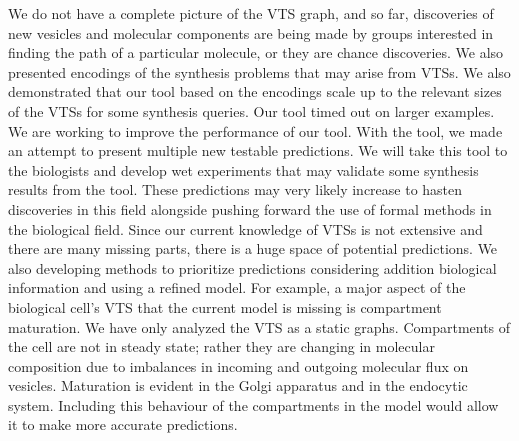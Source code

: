 We do not have a complete picture of the VTS graph, and so far,
discoveries of new vesicles and molecular components are being made by
groups interested in finding the path of a particular molecule, or
they are chance discoveries. 
%
We also presented encodings of the synthesis problems that may arise from VTSs.
%
We also demonstrated that our tool based on the encodings
scale up to the relevant sizes of the VTSs for some synthesis queries.
%
Our tool timed out on larger examples.
%
We are working to improve the performance of our tool.
%
%
With the tool, we made an attempt to present multiple new testable predictions. 
%
We will take this tool to the biologists and develop wet experiments that may
validate some synthesis results from the tool.
%
These predictions may very likely increase to hasten discoveries in this field
alongside pushing forward the use of formal methods in the biological field.
%
Since our current knowledge of VTSs is not extensive and there are many missing parts,
there is a huge space of potential predictions.
%
We also developing methods to prioritize predictions considering addition biological
information and using a refined model.
%
For example, a major aspect of the biological cell’s VTS that the current model is missing
is compartment maturation. 
%
We have only analyzed the VTS as a static graphs.
%
Compartments of the cell are not in steady state; rather they are changing in molecular composition due to imbalances in incoming and outgoing molecular flux on vesicles.
%
Maturation  is  evident  in  the  Golgi  apparatus  and  in  the  endocytic system. 
%
Including this behaviour of the compartments in the model would allow it to make more accurate predictions.


%


